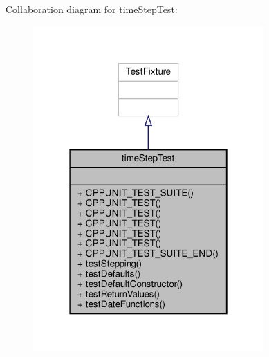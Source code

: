 Collaboration diagram for time\+Step\+Test\+:
\nopagebreak
\begin{figure}[H]
\begin{center}
\leavevmode
\includegraphics[width=250pt]{classtimeStepTest__coll__graph}
\end{center}
\end{figure}
